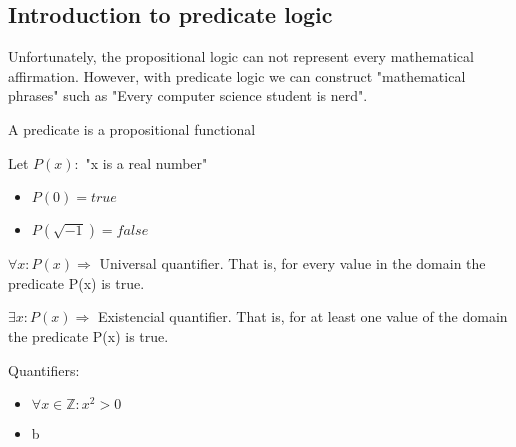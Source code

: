 

\subsection{Introduction to predicate logic}
\label{sub_sec:sub_section_2}

\par Unfortunately, the propositional logic can not represent every mathematical affirmation. However, with predicate logic we can construct "mathematical phrases" such as "Every computer science student is nerd". \\

\begin{note}
    \par A predicate is a propositional functional
    \begin{example}
        Let $P(x):$ "x is a real number"
        \begin{itemize}
            \item $P(0) = true$ 
            \item $P(\sqrt{-1}) = false$ 
        \end{itemize}
    \end{example}
\end{note}

\vspace{0.5cm}

\par $ \forall x: P(x) \Rightarrow$ Universal quantifier. That is, for every value in the domain the predicate P(x) is true.

\par $ \exists x: P(x) \Rightarrow$ Existencial quantifier. That is, for at least one value of the domain the predicate P(x) is true. 

\begin{example}
    \par Quantifiers: \\
    \begin{itemize}
        \item $ \forall x \in \mathbb{Z}: x^2 > 0$
        \item b 
    \end{itemize}
\end{example}





